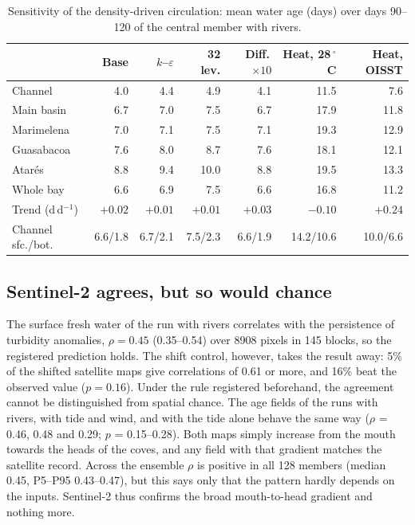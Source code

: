 \documentclass[a4paper,fleqn]{ems-dc}
\begin{document}
\begin{table}[!t]
\centering\small
\caption{Sensitivity of the density-driven circulation: mean water age (days) over days
90--120 of the central member with rivers.}\label{tab:robust}
\footnotesize\setlength{\tabcolsep}{4pt}
\begin{tabular}{lrrrrrr}
\toprule
& Base & $k$--$\varepsilon$ & 32 lev. & Diff.\,$\times10$ & Heat, 28\,$^\circ$C &
Heat, OISST\\
\midrule
Channel & 4.0 & 4.4 & 4.9 & 4.1 & 11.5 & 7.6\\
Main basin & 6.7 & 7.0 & 7.5 & 6.7 & 17.9 & 11.8\\
Marimelena & 7.0 & 7.1 & 7.5 & 7.1 & 19.3 & 12.9\\
Guasabacoa & 7.6 & 8.0 & 8.7 & 7.6 & 18.1 & 12.1\\
Atar\'es & 8.8 & 9.4 & 10.0 & 8.8 & 19.5 & 13.3\\
Whole bay & 6.6 & 6.9 & 7.5 & 6.6 & 16.8 & 11.2\\
Trend (d\,d$^{-1}$) & $+0.02$ & $+0.01$ & $+0.01$ & $+0.03$ & $-0.10$ & $+0.24$\\
Channel sfc./bot. & 6.6/1.8 & 6.7/2.1 & 7.5/2.3 & 6.6/1.9 &
14.2/10.6 & 10.0/6.6\\
\bottomrule
\end{tabular}
\end{table}

\subsection{Sentinel-2 agrees, but so would chance}\label{sec:res-s2}
The surface fresh water of the run with rivers correlates with the persistence of turbidity
anomalies, $\rho = 0.45$ (0.35--0.54) over 8908 pixels in 145 blocks, so the registered
prediction holds. The shift control, however, takes the result away: 5\% of the shifted
satellite maps give correlations of 0.61 or more, and 16\% beat the observed value
($p = 0.16$). Under the rule registered beforehand, the agreement cannot be
distinguished from spatial chance. The age fields of the runs with rivers, with tide and wind,
and with the tide alone behave the same way ($\rho$ = 0.46, 0.48 and 0.29;
$p$ = 0.15--0.28). Both maps simply increase from the mouth towards the heads of the coves, and any
field with that gradient matches the satellite record. Across the ensemble $\rho$ is positive
in all 128 members (median 0.45, P5--P95 0.43--0.47), but this says only that the pattern
hardly depends on the inputs. Sentinel-2 thus confirms the broad mouth-to-head gradient and
nothing more.
\end{document}
